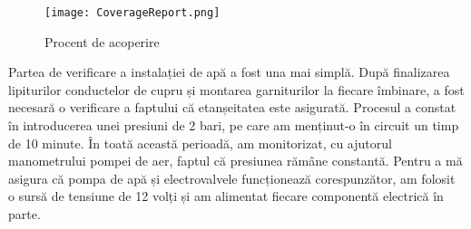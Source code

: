 \begin{figure}[H]
	\centering
    	\texttt{[image: CoverageReport.png]}
	\caption{Procent de acoperire}
\end{figure}    

\vspace{2em}

	Partea de verificare a instalației de apă a fost una mai simplă. După finalizarea lipiturilor conductelor de cupru și montarea garniturilor la fiecare îmbinare, a fost necesară o verificare a faptului că etanșeitatea este asigurată. Procesul a constat în introducerea unei presiuni de 2 bari, pe care am menținut-o în circuit un timp de 10 minute. În toată această perioadă, am monitorizat, cu ajutorul manometrului pompei de aer, faptul că presiunea rămâne constantă. Pentru a mă asigura că pompa de apă și electrovalvele funcționează corespunzător, am folosit o sursă de tensiune de 12 volți și am alimentat fiecare componentă electrică în parte. 


	